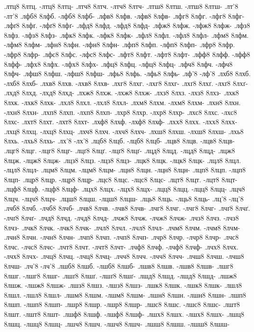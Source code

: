 {.лтц8 8лтц. -лтц8 8лтц-
.лтч8 8лтч. -лтч8 8лтч-
.лтш8 8лтш. -лтш8 8лтш-
.лт'8 -лт'8
.лфб8 8лфб. -лфб8 8лфб-
.лфв8 8лфв. -лфв8 8лфв-
.лфг8 8лфг. -лфг8 8лфг-
.лфґ8 8лфґ. -лфґ8 8лфґ-
.лфд8 8лфд. -лфд8 8лфд-
.лфж8 8лфж. -лфж8 8лфж-
.лфз8 8лфз. -лфз8 8лфз-
.лфк8 8лфк. -лфк8 8лфк-
.лфл8 8лфл. -лфл8 8лфл-
.лфм8 8лфм. -лфм8 8лфм-
.лфн8 8лфн. -лфн8 8лфн-
.лфп8 8лфп. -лфп8 8лфп-
.лфр8 8лфр. -лфр8 8лфр-
.лфс8 8лфс. -лфс8 8лфс-
.лфт8 8лфт. -лфт8 8лфт-
.лфф8 8лфф. -лфф8 8лфф-
.лфх8 8лфх. -лфх8 8лфх-
.лфц8 8лфц. -лфц8 8лфц-
.лфч8 8лфч. -лфч8 8лфч-
.лфш8 8лфш. -лфш8 8лфш-
.лфь8 8лфь. -лфь8 8лфь-
.лф'8 -лф'8
.лхб8 8лхб. -лхб8 8лхб-
.лхв8 8лхв. -лхв8 8лхв-
.лхг8 8лхг. -лхг8 8лхг-
.лхґ8 8лхґ. -лхґ8 8лхґ-
.лхд8 8лхд. -лхд8 8лхд-
.лхж8 8лхж. -лхж8 8лхж-
.лхз8 8лхз. -лхз8 8лхз-
.лхк8 8лхк. -лхк8 8лхк-
.лхл8 8лхл. -лхл8 8лхл-
.лхм8 8лхм. -лхм8 8лхм-
.лхн8 8лхн. -лхн8 8лхн-
.лхп8 8лхп. -лхп8 8лхп-
.лхр8 8лхр. -лхр8 8лхр-
.лхс8 8лхс. -лхс8 8лхс-
.лхт8 8лхт. -лхт8 8лхт-
.лхф8 8лхф. -лхф8 8лхф-
.лхх8 8лхх. -лхх8 8лхх-
.лхц8 8лхц. -лхц8 8лхц-
.лхч8 8лхч. -лхч8 8лхч-
.лхш8 8лхш. -лхш8 8лхш-
.лхь8 8лхь. -лхь8 8лхь-
.лх'8 -лх'8
.лцб8 8лцб. -лцб8 8лцб-
.лцв8 8лцв. -лцв8 8лцв-
.лцг8 8лцг. -лцг8 8лцг-
.лцґ8 8лцґ. -лцґ8 8лцґ-
.лцд8 8лцд. -лцд8 8лцд-
.лцж8 8лцж. -лцж8 8лцж-
.лцз8 8лцз. -лцз8 8лцз-
.лцк8 8лцк. -лцк8 8лцк-
.лцл8 8лцл. -лцл8 8лцл-
.лцм8 8лцм. -лцм8 8лцм-
.лцн8 8лцн. -лцн8 8лцн-
.лцп8 8лцп. -лцп8 8лцп-
.лцр8 8лцр. -лцр8 8лцр-
.лцс8 8лцс. -лцс8 8лцс-
.лцт8 8лцт. -лцт8 8лцт-
.лцф8 8лцф. -лцф8 8лцф-
.лцх8 8лцх. -лцх8 8лцх-
.лцц8 8лцц. -лцц8 8лцц-
.лцч8 8лцч. -лцч8 8лцч-
.лцш8 8лцш. -лцш8 8лцш-
.лць8 8лць. -лць8 8лць-
.лц'8 -лц'8
.лчб8 8лчб. -лчб8 8лчб-
.лчв8 8лчв. -лчв8 8лчв-
.лчг8 8лчг. -лчг8 8лчг-
.лчґ8 8лчґ. -лчґ8 8лчґ-
.лчд8 8лчд. -лчд8 8лчд-
.лчж8 8лчж. -лчж8 8лчж-
.лчз8 8лчз. -лчз8 8лчз-
.лчк8 8лчк. -лчк8 8лчк-
.лчл8 8лчл. -лчл8 8лчл-
.лчм8 8лчм. -лчм8 8лчм-
.лчн8 8лчн. -лчн8 8лчн-
.лчп8 8лчп. -лчп8 8лчп-
.лчр8 8лчр. -лчр8 8лчр-
.лчс8 8лчс. -лчс8 8лчс-
.лчт8 8лчт. -лчт8 8лчт-
.лчф8 8лчф. -лчф8 8лчф-
.лчх8 8лчх. -лчх8 8лчх-
.лчц8 8лчц. -лчц8 8лчц-
.лчч8 8лчч. -лчч8 8лчч-
.лчш8 8лчш. -лчш8 8лчш-
.лч'8 -лч'8
.лшб8 8лшб. -лшб8 8лшб-
.лшв8 8лшв. -лшв8 8лшв-
.лшг8 8лшг. -лшг8 8лшг-
.лшґ8 8лшґ. -лшґ8 8лшґ-
.лшд8 8лшд. -лшд8 8лшд-
.лшж8 8лшж. -лшж8 8лшж-
.лшз8 8лшз. -лшз8 8лшз-
.лшк8 8лшк. -лшк8 8лшк-
.лшл8 8лшл. -лшл8 8лшл-
.лшм8 8лшм. -лшм8 8лшм-
.лшн8 8лшн. -лшн8 8лшн-
.лшп8 8лшп. -лшп8 8лшп-
.лшр8 8лшр. -лшр8 8лшр-
.лшс8 8лшс. -лшс8 8лшс-
.лшт8 8лшт. -лшт8 8лшт-
.лшф8 8лшф. -лшф8 8лшф-
.лшх8 8лшх. -лшх8 8лшх-
.лшц8 8лшц. -лшц8 8лшц-
.лшч8 8лшч. -лшч8 8лшч-
.лшш8 8лшш. -лшш8 8лшш-
}
